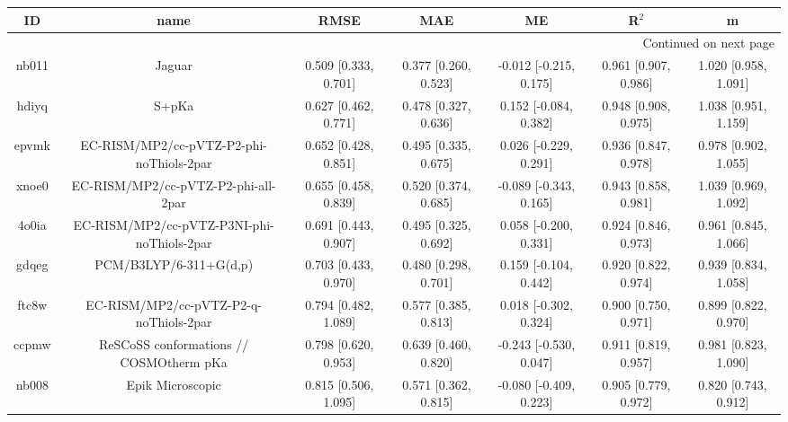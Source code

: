 \documentclass{article}
\begin{document}
\begin{center}
\begin{longtable}{|ccccccc|}
\toprule
    ID &                                               name &                  RMSE &                   MAE &                       ME &                 R$^2$ &                      m \\
\midrule
\endhead
\midrule
\multicolumn{7}{r}{{Continued on next page}} \\
\midrule
\endfoot

\bottomrule
\endlastfoot
 nb011 &                                             Jaguar &  0.509 [0.333, 0.701] &  0.377 [0.260, 0.523] &   -0.012 [-0.215, 0.175] &  0.961 [0.907, 0.986] &   1.020 [0.958, 1.091] \\
 hdiyq &                                              S+pKa &  0.627 [0.462, 0.771] &  0.478 [0.327, 0.636] &    0.152 [-0.084, 0.382] &  0.948 [0.908, 0.975] &   1.038 [0.951, 1.159] \\
 epvmk &           EC-RISM/MP2/cc-pVTZ-P2-phi-noThiols-2par &  0.652 [0.428, 0.851] &  0.495 [0.335, 0.675] &    0.026 [-0.229, 0.291] &  0.936 [0.847, 0.978] &   0.978 [0.902, 1.055] \\
 xnoe0 &                EC-RISM/MP2/cc-pVTZ-P2-phi-all-2par &  0.655 [0.458, 0.839] &  0.520 [0.374, 0.685] &   -0.089 [-0.343, 0.165] &  0.943 [0.858, 0.981] &   1.039 [0.969, 1.092] \\
 4o0ia &         EC-RISM/MP2/cc-pVTZ-P3NI-phi-noThiols-2par &  0.691 [0.443, 0.907] &  0.495 [0.325, 0.692] &    0.058 [-0.200, 0.331] &  0.924 [0.846, 0.973] &   0.961 [0.845, 1.066] \\
 gdqeg &                             PCM/B3LYP/6-311+G(d,p) &  0.703 [0.433, 0.970] &  0.480 [0.298, 0.701] &    0.159 [-0.104, 0.442] &  0.920 [0.822, 0.974] &   0.939 [0.834, 1.058] \\
 ftc8w &             EC-RISM/MP2/cc-pVTZ-P2-q-noThiols-2par &  0.794 [0.482, 1.089] &  0.577 [0.385, 0.813] &    0.018 [-0.302, 0.324] &  0.900 [0.750, 0.971] &   0.899 [0.822, 0.970] \\
 ccpmw &            ReSCoSS conformations // COSMOtherm pKa &  0.798 [0.620, 0.953] &  0.639 [0.460, 0.820] &   -0.243 [-0.530, 0.047] &  0.911 [0.819, 0.957] &   0.981 [0.823, 1.090] \\
 nb008 &                                   Epik Microscopic &  0.815 [0.506, 1.095] &  0.571 [0.362, 0.815] &   -0.080 [-0.409, 0.223] &  0.905 [0.779, 0.972] &   0.820 [0.743, 0.912] \\

\end{longtable}
\end{center}
\end{document}
